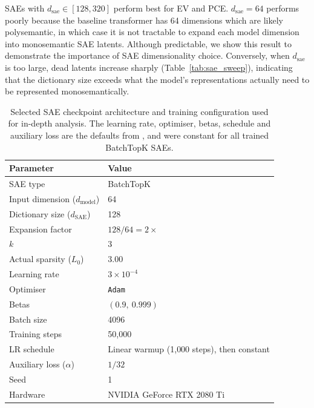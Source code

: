 SAEs with $d_\text{sae} \in [128,320]$ perform best for EV and PCE. 
$d_\text{sae} = 64$ performs poorly because the baseline transformer has 64 dimensions which are likely polysemantic, in which case it is not tractable to expand each model dimension into monosemantic SAE latents. Although predictable, we show this result to demonstrate the importance of SAE dimensionality choice.
Conversely, when $d_\text{sae}$ is too large, dead latents increase sharply (Table~\ref{tab:sae_sweep}), indicating that the dictionary size exceeds what the model's representations actually need to be represented monosemantically.

\begin{table}[htbp]
\caption{Selected SAE checkpoint architecture and training configuration used for in-depth analysis. The learning rate, optimiser, betas, schedule and auxiliary loss are the defaults from \cite{bussmann2024batchtopk,marks2024dictionary_learning}, and were constant for all trained BatchTopK SAEs.
}
\label{tab:sae_config}
\centering
\begin{tabular}{lp{3.8cm}}
\toprule
\textbf{Parameter} & \textbf{Value} \\
\midrule
SAE type & BatchTopK \cite{bussmann2024batchtopk} \\
Input dimension ($d_{\text{model}}$) & 64 \\
Dictionary size ($d_{\text{SAE}}$) & 128 \\
Expansion factor & $128 / 64 = 2\times$ \\
$k$ & 3 \\
Actual sparsity ($L_0$) & 3.00 \\
\midrule
Learning rate & $3 \times 10^{-4}$ \\
Optimiser & \texttt{Adam} \\
Betas & $(0.9,\ 0.999)$ \\
Batch size & 4096 \\
Training steps & 50{,}000 \\
LR schedule & Linear warmup (1{,}000 steps), then constant \\
Auxiliary loss ($\alpha$) & $1/32$ \\
Seed & 1 \\
\midrule
Hardware & NVIDIA GeForce RTX 2080 Ti \\
\bottomrule
\end{tabular}
\end{table}

